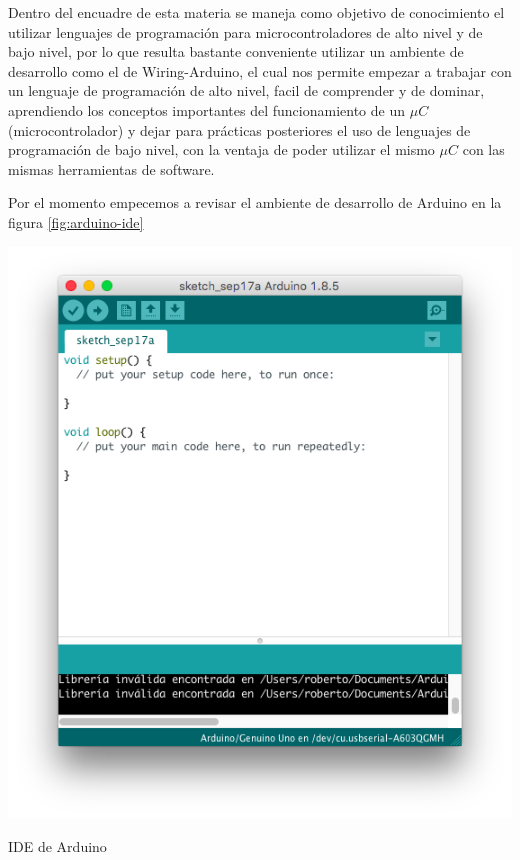 		Dentro del encuadre de esta materia se maneja como objetivo de conocimiento el utilizar lenguajes de programación para microcontroladores de alto nivel y de bajo nivel, por lo que resulta bastante conveniente utilizar un ambiente de desarrollo como el de Wiring-Arduino, el cual nos permite empezar a trabajar con un lenguaje de programación de alto nivel, facil de comprender y de dominar, aprendiendo los conceptos importantes del funcionamiento de un $\mu C$ (microcontrolador) y dejar para prácticas posteriores el uso de lenguajes de programación de bajo nivel, con la ventaja de poder utilizar el mismo $\mu C$ con las mismas herramientas de software.

		Por el momento empecemos a revisar el ambiente de desarrollo de Arduino en la figura \ref{fig:arduino-ide}

		\begin{marginfigure}
    	\begin{center}
    		\includegraphics[width=\textwidth]{images/Arduino-IDE.png}
    		\caption{IDE de Arduino}
    		\label{fig:arduino-ide}
    	\end{center}
    \end{marginfigure}


